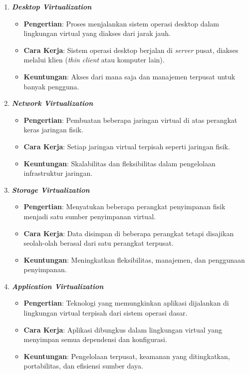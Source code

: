 \documentclass[12pt]{article}
\begin{document}
\begin{enumerate}
    \item \textbf{\textit{Desktop Virtualization}}
    \begin{itemize}
        \item \textbf{Pengertian}: Proses menjalankan sistem operasi desktop dalam lingkungan virtual yang diakses dari jarak jauh.
        \item \textbf{Cara Kerja}: Sistem operasi desktop berjalan di \textit{server} pusat, diakses melalui klien (\textit{thin client} atau komputer lain).
        \item \textbf{Keuntungan}: Akses dari mana saja dan manajemen terpusat untuk banyak pengguna.
    \end{itemize}

    \item \textbf{\textit{Network Virtualization}}
    \begin{itemize}
        \item \textbf{Pengertian}: Pembuatan beberapa jaringan virtual di atas perangkat keras jaringan fisik.
        \item \textbf{Cara Kerja}: Setiap jaringan virtual terpisah seperti jaringan fisik.
        \item \textbf{Keuntungan}: Skalabilitas dan fleksibilitas dalam pengelolaan infrastruktur jaringan.
    \end{itemize}

    \item \textbf{\textit{Storage Virtualization}}
    \begin{itemize}
        \item \textbf{Pengertian}: Menyatukan beberapa perangkat penyimpanan fisik menjadi satu sumber penyimpanan virtual.
        \item \textbf{Cara Kerja}: Data disimpan di beberapa perangkat tetapi disajikan seolah-olah berasal dari satu perangkat terpusat.
        \item \textbf{Keuntungan}: Meningkatkan fleksibilitas, manajemen, dan penggunaan penyimpanan.
    \end{itemize}

    \item \textbf{\textit{Application Virtualization}}
    \begin{itemize}
        \item \textbf{Pengertian}: Teknologi yang memungkinkan aplikasi dijalankan di lingkungan virtual terpisah dari sistem operasi dasar.
        \item \textbf{Cara Kerja}: Aplikasi dibungkus dalam lingkungan virtual yang menyimpan semua dependensi dan konfigurasi.
        \item \textbf{Keuntungan}: Pengelolaan terpusat, keamanan yang ditingkatkan, portabilitas, dan efisiensi sumber daya.
    \end{itemize}
\end{enumerate}
\end{document}
